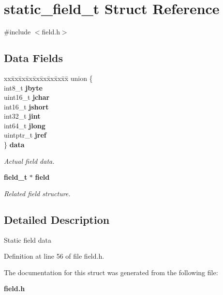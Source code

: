 \section{static\_\-field\_\-t Struct Reference}
\label{structstatic__field__t}


{\ttfamily \#include $<$field.h$>$}

\subsection*{Data Fields}
\begin{DoxyCompactItemize}
\item 
\begin{tabbing}
xx\=xx\=xx\=xx\=xx\=xx\=xx\=xx\=xx\=\kill
union \{\\
\>int8\_t {\bfseries jbyte}\\
\>uint16\_t {\bfseries jchar}\\
\>int16\_t {\bfseries jshort}\\
\>int32\_t {\bfseries jint}\\
\>int64\_t {\bfseries jlong}\\
\>uintptr\_t {\bfseries jref}\\
\} {\bf data}\label{structstatic__field__t_ac68b0dfe6376813ad459bc693962d26b}
\\

\end{tabbing}\begin{DoxyCompactList}\small\item\em Actual field data. \item\end{DoxyCompactList}\item 
{\bf field\_\-t} $\ast$ {\bf field}\label{structstatic__field__t_a0f33247ac8f5c5c9a717c9551f61e0ac}

\begin{DoxyCompactList}\small\item\em Related field structure. \item\end{DoxyCompactList}\end{DoxyCompactItemize}


\subsection{Detailed Description}
Static field data 

Definition at line 56 of file field.h.



The documentation for this struct was generated from the following file:\begin{DoxyCompactItemize}
\item 
{\bf field.h}\end{DoxyCompactItemize}
